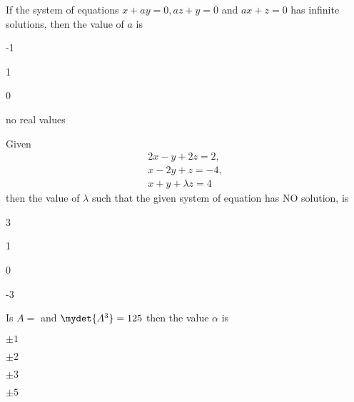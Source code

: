 \item If the system of equations $x + ay = 0, az + y =0$ and $ax + z =0$ has infinite solutions, then the value of $a$ is 
    \hfill{}
    \begin{enumerate}
            \begin{multicols}{2}
            \item -1 \columnbreak
            \item 1
            \end{multicols}
            \begin{multicols}{2}

            \item 0 \columnbreak
            \item no real values
            \end{multicols}
    \end{enumerate}


\item  Given \begin{align*} 2x-y+2z=2,\\x-2y+z=-4,\\x+y+\lambda z=4 \end{align*} then the value of $\lambda$ such that the given system of equation has NO solution, is

        \hfill{}
        \begin{enumerate}
                \begin{multicols}{4}
                \item 3 \columnbreak
                \item 1 \columnbreak
                \item 0 \columnbreak
                \item -3
                \end{multicols}
        \end{enumerate}
    \item Is $A=$  and $\mydet{A^3}=125$ then the value $\alpha$ is
        \hfill{}
        \begin{enumerate}
                \begin{multicols}{4}
                \item $\pm 1$ \columnbreak
                \item $\pm 2$ \columnbreak
                \item $\pm 3$ \columnbreak
                \item $\pm 5$
                \end{multicols}
        \end{enumerate}



